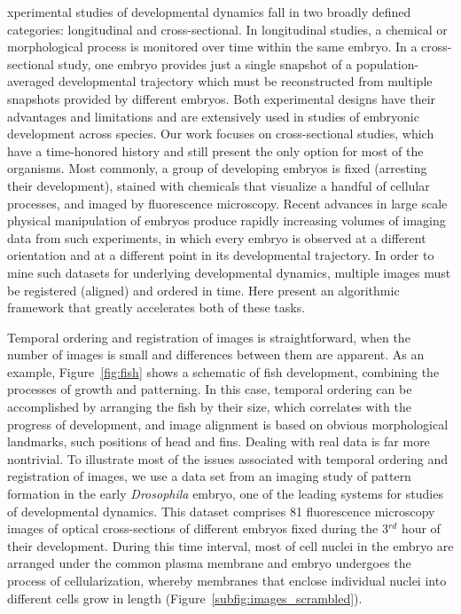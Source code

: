 \documentclass{pnastwo}
\begin{document}
\begin{article}
xperimental studies of developmental dynamics fall in two broadly defined categories: longitudinal and cross-sectional.  
%
In longitudinal studies, a chemical or morphological process is monitored over time within the same embryo.  
%
In a cross-sectional study, one embryo provides just a single snapshot of a population-averaged developmental trajectory which must be reconstructed from multiple snapshots provided by different embryos.
%
Both experimental designs have their advantages and limitations and are extensively used in studies of embryonic development across species. 
%
Our work focuses on cross-sectional studies, which have a time-honored history and still present the only option for most of the organisms.  
%
Most commonly, a group of developing embryos is fixed (arresting their development), stained with chemicals that visualize a handful of cellular processes, and imaged by fluorescence microscopy. 
%
Recent advances in large scale physical manipulation of embryos produce rapidly increasing volumes of imaging data from such experiments, in which every embryo is observed at a different orientation and at a different point in its developmental trajectory. 
%
In order to mine such datasets for underlying developmental dynamics, multiple images must be registered (aligned) and ordered in time. 
%
Here present an algorithmic framework that greatly accelerates both of these tasks.

Temporal ordering and registration of images is straightforward, when the number of images is small and differences between them are apparent. 
%
As an example, Figure~\ref{fig:fish} shows a schematic of fish development, combining the processes of growth and patterning.  
%
In this case, temporal ordering can be accomplished by arranging the fish by their size, which correlates with the progress of development, and image alignment is based on obvious morphological landmarks, such positions of head and fins. 
%
Dealing with real data is far more nontrivial. 
%
To illustrate most of the issues associated with temporal ordering and registration of images, we use a data set from an imaging study of pattern formation in the early {\em Drosophila} embryo, one of the leading systems for studies of developmental dynamics. 
%
This dataset comprises 81 fluorescence microscopy images of optical cross-sections of different embryos fixed during the 3$^{rd}$ hour of their development.  
%
During this time interval, most of cell nuclei in the embryo are arranged under the common plasma membrane and embryo undergoes the process of cellularization, whereby membranes that enclose individual nuclei into different cells grow in length (Figure~\ref{subfig:images_scrambled}). 


\end{article}
\end{document}
